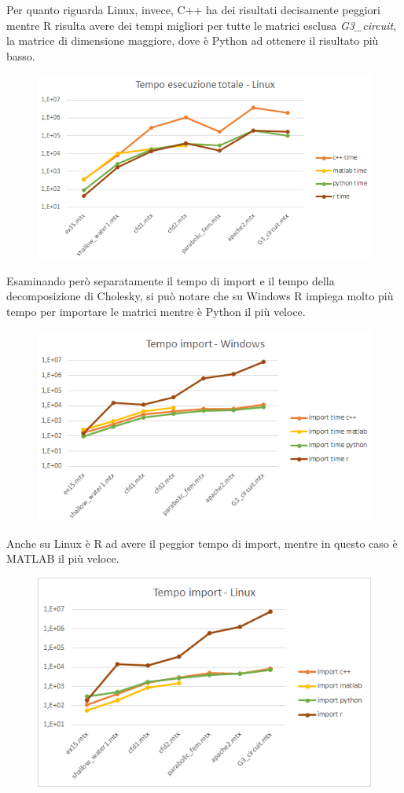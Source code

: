 \documentclass[a4paper,12pt]{article}
\begin{document}
\noindent Per quanto riguarda Linux, invece, C++ ha dei risultati decisamente peggiori mentre R risulta avere dei tempi migliori per tutte le matrici esclusa \textit{G3\_circuit}, la matrice di dimensione maggiore, dove è Python ad ottenere il risultato più basso.

\begin{figure}[H]
\centering
  \includegraphics[width=0.8\linewidth]{img/tempototlinux.png}
\end{figure}

\fancyhf{}
\rhead{\leftmark}
\fancyfoot[C]{\thepage}

\noindent Esaminando però separatamente il tempo di import e il tempo della decomposizione di Cholesky, si può notare che su Windows R impiega molto più tempo per importare le matrici mentre è Python il più veloce.

\begin{figure}[H]
\centering
  \includegraphics[width=0.8\linewidth]{img/tempoimpwin.png}
\end{figure}

\noindent Anche su Linux è R ad avere il peggior tempo di import, mentre in questo caso è MATLAB il più veloce.
\begin{figure}[H]
\centering
  \includegraphics[width=0.7\linewidth]{img/tempoimplinux.png}
\end{figure}
\end{document}
